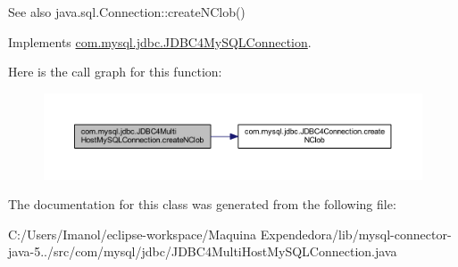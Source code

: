 \begin{DoxySeeAlso}{See also}
java.\+sql.\+Connection\+::create\+N\+Clob() 
\end{DoxySeeAlso}


Implements \mbox{\hyperlink{interfacecom_1_1mysql_1_1jdbc_1_1_j_d_b_c4_my_s_q_l_connection}{com.\+mysql.\+jdbc.\+J\+D\+B\+C4\+My\+S\+Q\+L\+Connection}}.

Here is the call graph for this function\+:
\nopagebreak
\begin{figure}[H]
\begin{center}
\leavevmode
\includegraphics[width=350pt]{classcom_1_1mysql_1_1jdbc_1_1_j_d_b_c4_multi_host_my_s_q_l_connection_a1d465e43c68df080280c241cf3b29c9c_cgraph}
\end{center}
\end{figure}


The documentation for this class was generated from the following file\+:\begin{DoxyCompactItemize}
\item 
C\+:/\+Users/\+Imanol/eclipse-\/workspace/\+Maquina Expendedora/lib/mysql-\/connector-\/java-\/5../src/com/mysql/jdbc/J\+D\+B\+C4\+Multi\+Host\+My\+S\+Q\+L\+Connection.\+java\end{DoxyCompactItemize}
